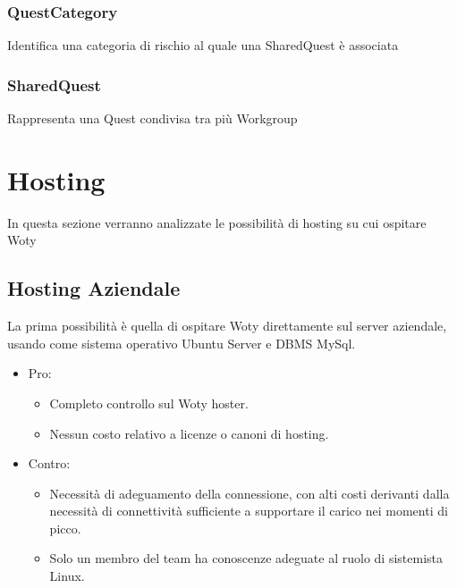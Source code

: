 \subsubsection{QuestCategory}Identifica una categoria di rischio al quale una SharedQuest è associata
\subsubsection{SharedQuest}Rappresenta una Quest condivisa tra più Workgroup

\section{Hosting}
In questa sezione verranno analizzate le possibilità di hosting su cui ospitare Woty
\subsection{Hosting Aziendale}
La prima possibilità è quella di ospitare Woty direttamente sul server aziendale, usando come sistema operativo Ubuntu Server e DBMS MySql.
\\
\begin{itemize}
\item Pro:
\begin{itemize}
\item Completo controllo sul Woty hoster.
\item Nessun costo relativo a licenze o canoni di hosting.
\end{itemize}
\item Contro:
\begin{itemize}
\item Necessità di adeguamento della connessione, con alti costi derivanti dalla necessità di connettività sufficiente a supportare il carico nei momenti di picco.
\item Solo un membro del team ha conoscenze adeguate al ruolo di sistemista Linux.
\end{itemize}
\end{itemize}

